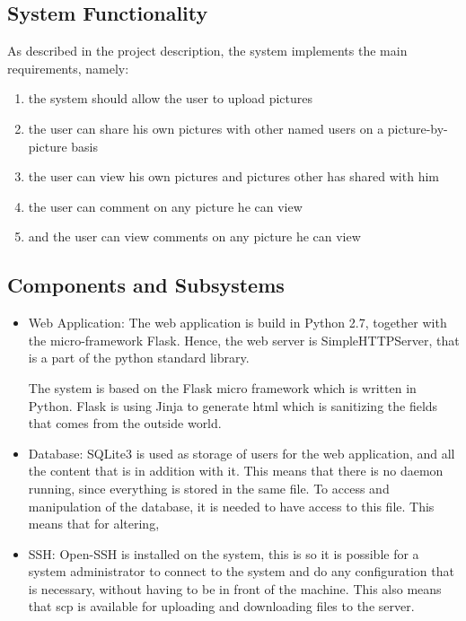 \documentclass{article}
\begin{document}
\subsection{System Functionality}

As described in the project description, the system implements the main requirements, namely:

\begin{enumerate}
\item the system should allow the user to upload pictures 
\item the user can share his own pictures with other named users on a picture-by-picture basis
\item the user can view his own pictures and pictures other has shared with him
\item the user can comment on any picture he can view
\item and the user can view comments on any picture he can view  
\end{enumerate}


    

\subsection{Components and Subsystems}

\begin{itemize}
\item Web Application: The web application is build in Python 2.7, together with the micro-framework Flask. Hence, the web server is SimpleHTTPServer, that is a part of the python standard library.

The system is based on the Flask micro framework which is written in Python. Flask is using Jinja to generate html which is sanitizing the fields that comes from the outside world. 

\item Database: SQLite3 is used as storage of users for the web application, and all the content that is in addition with it. This means that there is no daemon running, since everything is stored in the same file. To access and manipulation of the database, it is needed to have access to this file. This means that for altering, 

\item SSH: Open-SSH is installed on the system, this is so it is possible for a system administrator to connect to the system and do any configuration that is necessary, without having to be in front of the machine. This also means that scp is available for uploading and downloading files to the server. 
\end{itemize}
\end{document}
